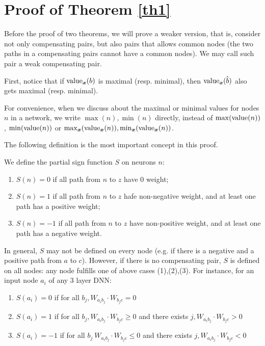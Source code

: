 	\section{Proof of Theorem \ref{th1}}	

Before the proof of two theorems, we will prove a weaker version, that is, consider not only compensating pairs, but also pairs that allows common nodes (the two paths in a compensating pairs cannot have a common nodes). We may call such pair a weak compensating pair.


First, notice that if ${\textrm{value}}_{\boldsymbol{x}}(b)$ is maximal (resp. minimal), 
then ${\textrm{value}}_{\boldsymbol{x}}(\hat{b})$ also gets maximal (resp. minimal). 

For convenience, when we discuss about the maximal or minimal values for nodes $n$ in a network, we write $\max(n),\min(n)$ directly, instead of $\max({\textrm{value}}(n))$, $\min({\textrm{value}}(n))$ or $\max_{\boldsymbol{x}}({\textrm{value}}_{\boldsymbol{x}}(n)),\min_{\boldsymbol{x}}({\textrm{value}}_{\boldsymbol{x}}(n))$.


The following definition is the most important concept in this proof.

\begin{definition}\label{sign_of_nodes}
	We define the partial sign function $S$ on neurons $n$: 	
	\begin{enumerate}
		\item $S(n)=0$ if all path from $n$ to $z$ have 0 weight; 
		\item $S(n)=1$ if all path from $n$ to $z$ hafe non-negative weight, and at least one path has a positive weight; 
		\item $S(n)=-1$ if all path from $n$ to $z$ have non-positive weight, and at least one path has a negative weight. 
	\end{enumerate}
\end{definition}

In general, $S$ may not be defined on every node (e.g. if there is a negative and a positive path from $a$ to $c$). However, if there is no compensating pair, $S$ is defined on all nodes: any node fulfills one of above cases (1),(2),(3).
For instance, for an input node $a_i$ of any 3 layer DNN:
\begin{enumerate}
	\item  $S(a_i)=0$ if 
	for all $b_j, W_{a_i b_j}\cdot W_{b_j c} = 0$
	
	
	\item  $S(a_i)=1$ if for all $b_j, W_{a_i b_j}\cdot W_{b_j c} \geq 0$ and there exists 
	$j, W_{a_i b_j}\cdot W_{b_j c} > 0$
	
	\item $S(a_i)=-1$ if for all $b_j\ W_{a_i b_j}\cdot W_{b_j c} \leq 0$ and there exists 
	$j, W_{a_i b_j}\cdot W_{b_j c} < 0$ 
\end{enumerate}

